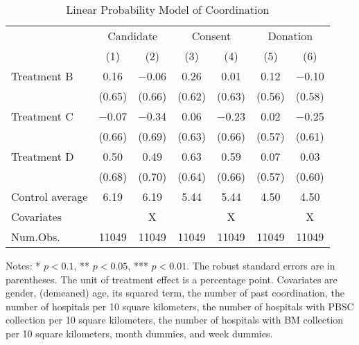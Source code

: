 \documentclass[12pt, a4paper]{article}
\begin{document}
\begin{table}[H]

\caption{\label{tab:coordinate-reg}Linear Probability Model of Coordination}
\centering
\fontsize{9}{11}\selectfont
\begin{threeparttable}
\begin{tabular}[t]{lcccccc}
\toprule
\multicolumn{1}{c}{ } & \multicolumn{2}{c}{Candidate} & \multicolumn{2}{c}{Consent} & \multicolumn{2}{c}{Donation} \\
\cmidrule(l{3pt}r{3pt}){2-3} \cmidrule(l{3pt}r{3pt}){4-5} \cmidrule(l{3pt}r{3pt}){6-7}
  & (1) & (2) & (3) & (4) & (5) & (6)\\
\midrule
Treatment B & \num{0.16} & \num{-0.06} & \num{0.26} & \num{0.01} & \num{0.12} & \num{-0.10}\\
 & (\num{0.65}) & (\num{0.66}) & (\num{0.62}) & (\num{0.63}) & (\num{0.56}) & (\num{0.58})\\
Treatment C & \num{-0.07} & \num{-0.34} & \num{0.06} & \num{-0.23} & \num{0.02} & \num{-0.25}\\
 & (\num{0.66}) & (\num{0.69}) & (\num{0.63}) & (\num{0.66}) & (\num{0.57}) & (\num{0.61})\\
Treatment D & \num{0.50} & \num{0.49} & \num{0.63} & \num{0.59} & \num{0.07} & \num{0.03}\\
 & (\num{0.68}) & (\num{0.70}) & (\num{0.64}) & (\num{0.66}) & (\num{0.57}) & (\num{0.60})\\
\midrule
Control average & 6.19 & 6.19 & 5.44 & 5.44 & 4.50 & 4.50\\
Covariates &  & X &  & X &  & X\\
Num.Obs. & \num{11049} & \num{11049} & \num{11049} & \num{11049} & \num{11049} & \num{11049}\\
\bottomrule
\end{tabular}
\begin{tablenotes}
\item Notes: * $p < 0.1$, ** $p < 0.05$, *** $p < 0.01$. The robust standard errors are in parentheses. The unit of treatment effect is a percentage point. Covariates are gender, (demeaned) age, its squared term, the number of past coordination, the number of hospitals per 10 square kilometers, the number of hospitals with PBSC collection per 10 square kilometers, the number of hospitals with BM collection per 10 square kilometers, month dummies, and week dummies.
\end{tablenotes}
\end{threeparttable}
\end{table}
\end{document}
